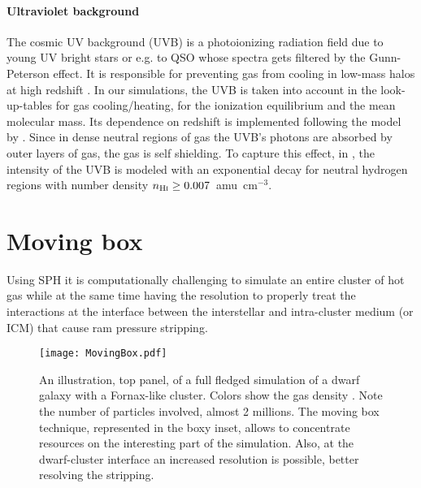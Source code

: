 \paragraph{Ultraviolet background}
The cosmic UV background (UVB) is a photoionizing radiation field due to young UV bright stars or e.g. to QSO whose spectra gets filtered by the Gunn-Peterson effect. It is responsible for preventing gas from cooling in low-mass halos at high redshift \citep{Efstathiou1992, Navarro1997}.
In our simulations, the UVB is taken into account in the look-up-tables for gas cooling/heating, for the ionization equilibrium and the mean molecular mass. Its dependence on redshift is implemented following the model by \citet{Faucher-Giguere2009}.
Since in dense neutral regions of gas the UVB's photons are absorbed by outer layers of gas, the gas is self shielding. To capture this effect, in \citet{DeRijcke2013}, the intensity of the UVB is modeled with an exponential decay for neutral hydrogen regions with number density $n_{\text{H}\textsc i} \geq 0.007$~amu~cm$^{-3}$.


\section{Moving box}
\label{sec:MovingBox}
Using SPH it is computationally challenging to simulate an entire cluster of hot gas while at the same time having the resolution to properly treat the interactions at the interface between the interstellar and intra-cluster medium (or ICM) that cause ram pressure stripping.

\begin{figure}[h]
 \centering
 \texttt{[image: MovingBox.pdf]}
 \caption{An illustration, top panel, of a full fledged simulation of a dwarf galaxy with a Fornax-like cluster. 
 Colors show the gas density \citep[using the \texttt{glnemo2} software][]{Lambert2012}.
 Note the number of particles involved, almost 2 millions.
 The moving box technique, represented in the boxy inset, allows to concentrate resources on the interesting part of the simulation.
 Also, at the dwarf-cluster interface an increased resolution is possible, better resolving the stripping.}
 \label{fig:MovingBox}
\end{figure}

